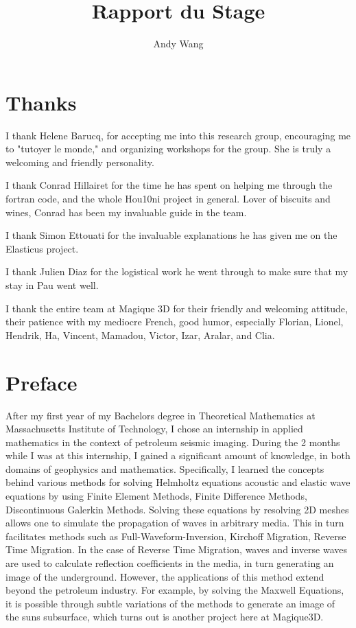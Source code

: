 \documentclass[twoside,titlepage,12pt]{article}
\author{Andy Wang}
\title{Rapport du Stage}
\numberwithin{equation}{section}
\begin{document}
\maketitle

\tableofcontents
\newpage

\part{Thanks}

I thank Helene Barucq, for accepting me into this research group, encouraging me to "tutoyer le monde," and organizing workshops for the group. She is truly a welcoming and friendly personality.

I thank Conrad Hillairet for the time he has spent on helping me through the fortran code, and the whole Hou10ni project in general. Lover of biscuits and wines, Conrad has been my invaluable guide in the team.

I thank Simon Ettouati for the invaluable explanations he has given me on the Elasticus project. 

I thank Julien Diaz for the logistical work he went through to make sure that my stay in Pau went well.

I thank the entire team at Magique 3D for their friendly and welcoming attitude, their patience with my mediocre French, good humor, especially Florian, Lionel, Hendrik, Ha, Vincent, Mamadou, Victor, Izar, Aralar, and Clia.


\part{Preface}

After my first year of my Bachelors degree in Theoretical Mathematics at Massachusetts Institute of Technology, I chose an internship in applied mathematics in the context of petroleum seismic imaging. During the 2 months while I was at this internship, I gained a significant amount of knowledge, in both domains of geophysics and mathematics. Specifically, I learned the concepts behind various methods for solving Helmholtz equations acoustic and elastic wave equations by using Finite Element Methods, Finite Difference Methods, Discontinuous Galerkin Methods. Solving these equations by resolving 2D meshes allows one to simulate the propagation of waves in arbitrary media. This in turn facilitates methods such as Full-Waveform-Inversion, Kirchoff Migration, Reverse Time Migration. In the case of Reverse Time Migration, waves and inverse waves are used to calculate reflection coefficients in the media, in turn generating an image of the underground. However, the applications of this method extend beyond the petroleum industry. For example, by solving the Maxwell Equations, it is possible through subtle variations of the methods to generate an image of the suns subsurface, which turns out is another project here at Magique3D.
\end{document}
